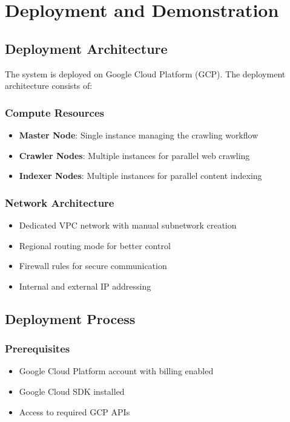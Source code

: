 \documentclass[12pt,a4paper]{report}
\begin{document}
\chapter{Deployment and Demonstration}

\section{Deployment Architecture}
The system is deployed on Google Cloud Platform (GCP).  The deployment architecture consists of:

\subsection{Compute Resources}
\begin{itemize}
\item \textbf{Master Node}: Single instance managing the crawling workflow
\item \textbf{Crawler Nodes}: Multiple instances for parallel web crawling
\item \textbf{Indexer Nodes}: Multiple instances for parallel content indexing
\end{itemize}

\subsection{Network Architecture}
\begin{itemize}
\item Dedicated VPC network with manual subnetwork creation
\item Regional routing mode for better control
\item Firewall rules for secure communication
\item Internal and external IP addressing
\end{itemize}

\section{Deployment Process}

\subsection{Prerequisites}
\begin{itemize}
\item Google Cloud Platform account with billing enabled
\item Google Cloud SDK installed
\item Access to required GCP APIs
\end{itemize}
\end{document}
